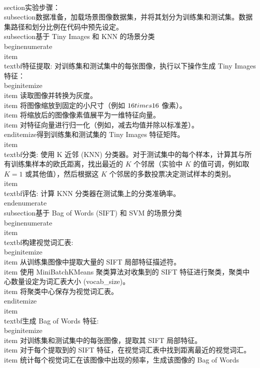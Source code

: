 \\section{实验步骤}\n{}：\n\n\\subsection{数据准备}\n{}，加载场景图像数据集，并将其划分为训练集和测试集。数据集路径和划分比例在代码中预先设定。\n\n\\subsection{基于 Tiny Images 和 KNN 的场景分类}\n\n\\begin{enumerate}\n    \\item \\textbf{特征提取:} 对训练集和测试集中的每张图像，执行以下操作生成 Tiny Images 特征：\n    \\begin{itemize}\n        \\item 读取图像并转换为灰度。\n        \\item 将图像缩放到固定的小尺寸（例如 $16 \\times 16$ 像素）。\n        \\item 将缩放后的图像像素值展平为一维特征向量。\n        \\item 对特征向量进行归一化（例如，减去均值并除以标准差）。\n    \\end{itemize}\n    得到训练集和测试集的 Tiny Images 特征矩阵。\n    \\item \\textbf{分类:} 使用 K 近邻 (KNN) 分类器。对于测试集中的每个样本，计算其与所有训练集样本的欧氏距离，找出最近的 $K$ 个邻居（实验中 $K$ 的值可调，例如取 $K=1$ 或其他值），然后根据这 $K$ 个邻居的多数投票决定测试样本的类别。\n    \\item \\textbf{评估:} 计算 KNN 分类器在测试集上的分类准确率。\n\\end{enumerate}\n\n\\subsection{基于 Bag of Words (SIFT) 和 SVM 的场景分类}\n\n\\begin{enumerate}\n    \\item \\textbf{构建视觉词汇表:}\n    \\begin{itemize}\n        \\item 从训练集图像中提取大量的 SIFT 局部特征描述符。\n        \\item 使用 MiniBatchKMeans 聚类算法对收集到的 SIFT 特征进行聚类，聚类中心数量设定为词汇表大小 (vocab\_size)。\n        \\item 将聚类中心保存为视觉词汇表。\n    \\end{itemize}\n    \\item \\textbf{生成 Bag of Words 特征:}\n    \\begin{itemize}\n        \\item 对训练集和测试集中的每张图像，提取其 SIFT 局部特征。\n        \\item 对于每个提取到的 SIFT 特征，在视觉词汇表中找到距离最近的视觉词汇。\n        \\item 统计每个视觉词汇在该图像中出现的频率，生成该图像的 Bag of Words 